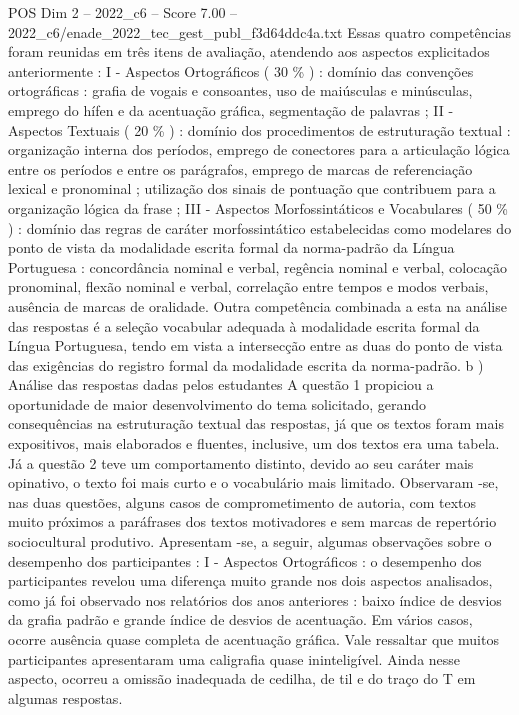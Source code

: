 \begin{textsample}{POS Dim 2 – 2022\_c6 – Score 7.00 – 2022\_c6/enade\_2022\_tec\_gest\_publ\_f3d64ddc4a.txt}
Essas quatro competências foram reunidas em três itens de avaliação, atendendo aos aspectos explicitados anteriormente : I - Aspectos Ortográficos ( 30 \% ) : domínio das convenções ortográficas : grafia de vogais e consoantes, uso de maiúsculas e minúsculas, emprego do hífen e da acentuação gráfica, segmentação de palavras ; II - Aspectos Textuais ( 20 \% ) : domínio dos procedimentos de estruturação textual : organização interna dos períodos, emprego de conectores para a articulação lógica entre os períodos e entre os parágrafos, emprego de marcas de referenciação lexical e pronominal ; utilização dos sinais de pontuação que contribuem para a organização lógica da frase ; III - Aspectos Morfossintáticos e Vocabulares ( 50 \% ) : domínio das regras de caráter morfossintático estabelecidas como modelares do ponto de vista da modalidade escrita formal da norma-padrão da Língua Portuguesa : concordância nominal e verbal, regência nominal e verbal, colocação pronominal, flexão nominal e verbal, correlação entre tempos e modos verbais, ausência de marcas de oralidade.
Outra competência combinada a esta na análise das respostas é a seleção vocabular adequada à modalidade escrita formal da Língua Portuguesa, tendo em vista a intersecção entre as duas do ponto de vista das exigências do registro formal da modalidade escrita da norma-padrão. b ) Análise das respostas dadas pelos estudantes A questão 1 propiciou a oportunidade de maior desenvolvimento do tema solicitado, gerando consequências na estruturação textual das respostas, já que os textos foram mais expositivos, mais elaborados e fluentes, inclusive, um dos textos era uma tabela.
Já a questão 2 teve um comportamento distinto, devido ao seu caráter mais opinativo, o texto foi mais curto e o vocabulário mais limitado.
Observaram -se, nas duas questões, alguns casos de comprometimento de autoria, com textos muito próximos a paráfrases dos textos motivadores e sem marcas de repertório sociocultural produtivo.
Apresentam -se, a seguir, algumas observações sobre o desempenho dos participantes : I - Aspectos Ortográficos : o desempenho dos participantes revelou uma diferença muito grande nos dois aspectos analisados, como já foi observado nos relatórios dos anos anteriores : baixo índice de desvios da grafia padrão e grande índice de desvios de acentuação.
Em vários casos, ocorre ausência quase completa de acentuação gráfica.
Vale ressaltar que muitos participantes apresentaram uma caligrafia quase ininteligível.
Ainda nesse aspecto, ocorreu a omissão inadequada de cedilha, de til e do traço do T em algumas respostas.

\end{textsample}
